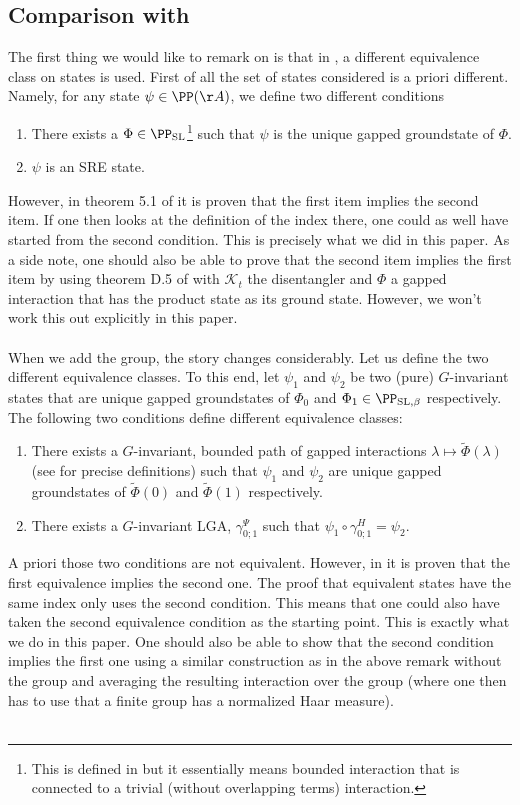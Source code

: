 \subsection{Comparison with \texorpdfstring{\cite{Ogata2d}}{}}\label{sec:SomeRemarks}
The first thing we would like to remark on is that in \cite{Ogata2d}, a different equivalence class on states is used. First of all the set of states considered is a priori different. Namely, for any state $\psi\in \PP(\AA)$, we define two different conditions
\begin{enumerate}
	\item There exists a $\Phi\in\PP_{\text{SL}}$\footnote{This is defined in \cite{Ogata2d} but it essentially means bounded interaction that is connected to a trivial (without overlapping terms) interaction.} such that $\psi$ is the unique gapped groundstate of $\Phi$.
	\item $\psi$ is an SRE state.
\end{enumerate}
However, in theorem 5.1 of \cite{Ogata2d} it is proven that the first item implies the second item. If one then looks at the definition of the index there, one could as well have started from the second condition. This is precisely what we did in this paper. As a side note, one should also be able to prove that the second item implies the first item by using theorem D.5 of \cite{Ogata2d} with $\mathcal{K}_t$ the disentangler and $\Phi$ a gapped interaction that has the product state as its ground state. However, we won't work this out explicitly in this paper.\\\\
When we add the group, the story changes considerably. Let us define the two different equivalence classes. To this end, let $\psi_1$ and $\psi_2$ be two (pure) $G$-invariant states that are unique gapped groundstates of $\Phi_0$ and $\Phi_1\in\PP_{\text{SL},\beta}$ respectively. The following two conditions define different equivalence classes:
\begin{enumerate}
	\item There exists a $G$-invariant, bounded path of gapped interactions $\lambda\mapsto\tilde\Phi(\lambda)$ (see \cite{Ogata2d} for precise definitions) such that $\psi_1$ and $\psi_2$ are unique gapped groundstates of $\tilde{\Phi}(0)$ and $\tilde{\Phi}(1)$ respectively.
	\item There exists a $G$-invariant LGA, $\gamma^\Psi_{0;1}$ such that $\psi_1\circ\gamma^H_{0;1}=\psi_2$.
\end{enumerate}
A priori those two conditions are not equivalent. However, in \cite{Ogata2d} it is proven that the first equivalence implies the second one. The proof that equivalent states have the same index only uses the second condition. This means that one could also have taken the second equivalence condition as the starting point. This is exactly what we do in this paper. One should also be able to show that the second condition implies the first one using a similar construction as in the above remark without the group and averaging the resulting interaction over the group (where one then has to use that a finite group has a normalized Haar measure).\\\\
